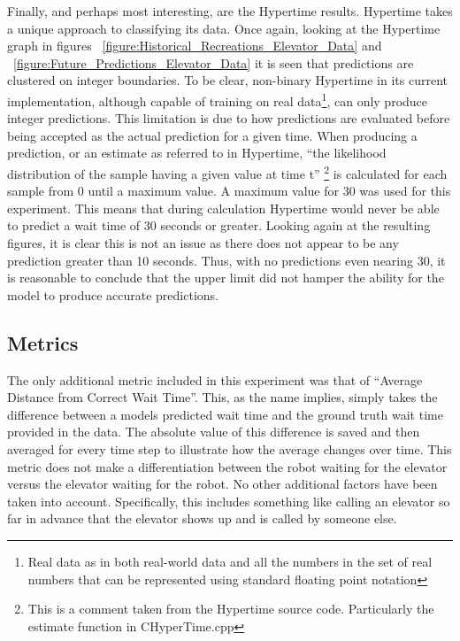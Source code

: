 \begin{center}
\begin{center}
Finally, and perhaps most interesting, are the Hypertime results. Hypertime takes a
unique approach to classifying its data. Once again, looking at the Hypertime
graph in figures ~\ref{figure:Historical_Recreations_Elevator_Data} and
~\ref{figure:Future_Predictions_Elevator_Data}
it is seen that predictions are clustered on integer boundaries. To be clear,
non-binary Hypertime in its current implementation, although capable of training
on real data\footnote[1]{Real data as in both real-world data and all the numbers in the set of real numbers that can be represented using standard floating point notation},
can only produce
integer predictions. This limitation is due to how predictions are evaluated
before being accepted as the actual prediction for a given time.
When producing a prediction, or an
estimate as referred to in Hypertime, ``the likelihood distribution of the
sample having a given value at time t''
\footnote[2]{This is a comment taken from the Hypertime source code. Particularly the estimate function in CHyperTime.cpp}
is calculated
for each sample from 0 until a maximum value. A maximum value for 30 was used
for this experiment. This means that during calculation Hypertime would never
be able to predict a wait time of 30 seconds or greater. Looking again at the
resulting figures, it is clear this is not an issue as there does not appear to
be any prediction greater than 10 seconds. Thus, with no predictions even
nearing 30, it is reasonable to conclude that the upper limit did not hamper the ability for
the model to produce accurate predictions. \\

\subsection{ Metrics }

The only additional metric included in this experiment was that of ``Average
Distance from Correct Wait Time''. This, as the name implies, simply takes the
difference between a models predicted wait time and the ground truth wait time
provided in the data. The absolute value of this difference is saved and then
averaged for every time step to illustrate how the average changes over time. This
metric does not make a differentiation between the robot waiting for the
elevator versus the elevator waiting for the robot. No other additional
factors have been taken into account. Specifically, this includes something like calling an
elevator so far in advance that the elevator shows up and is called by someone else. \\


\end{center}
\end{center}
